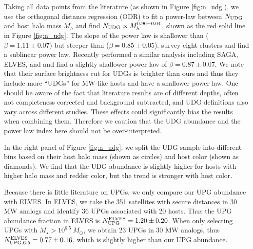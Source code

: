 \documentclass[twocolumn,astrosymb,twocolappendix]{aastex631}
\begin{document}
\begin{CJK*}{UTF8}{gbsn}
Taking all data points from the literature (as shown in Figure \ref{fig:n_udg}), we use the orthogonal distance regression (ODR) to fit a power-law between $N_{\rm UDG}$ and host halo mass $M_h$ and find $N_{\rm UDG} \propto M_h^{0.96\pm 0.04}$, shown as the red solid line in Figure \ref{fig:n_udg}. The slope of the power law is shallower than \citet{vdBurg2017} ($\beta=1.11\pm0.07$) but steeper than \citet{Roman2017b} ($\beta=0.85\pm0.05$). \citet{ManceraPina2018} survey eight clusters and find a sublinear power law. Recently \citet{Karunakaran2022b} performed a similar analysis including SAGA, ELVES, and \citet{Nashimoto2022} and find a slightly shallower power law of $\beta=0.87\pm0.07$. We note that their surface brightness cut for UDGs is brighter than ours and thus they include more ``UDGs'' for MW-like hosts and have a shallower power law. One should be aware of the fact that literature results are of different depths, often not completeness corrected and background subtracted, and UDG definitions also vary across different studies. These effects could significantly bias the results when combining them. Therefore we caution that the UDG abundance and the power law index here should not be over-interpreted. 


In the right panel of Figure \ref{fig:n_udg}, we split the UDG sample into different bins based on their host halo mass (shown as circles) and host color (shown as diamonds). We find that the UDG abundance is slightly higher for hosts with higher halo mass and redder color, but the trend is stronger with host color. 

Because there is little literature on UPGs, we only compare our UPG abundance with ELVES. In ELVES, we take the 351 satellites with secure distances in 30 MW analogs and identify 36 UPGs associated with 20 hosts. Thus the UPG abundance fraction in ELVES is $N_{\rm UPG}^{\rm ELVES} = 1.20 \pm 0.20$. When only selecting UPGs with $M_\star > 10^{6.5}\ M_\odot$, we obtain 23 UPGs in 30 MW analogs, thus $N_{\rm UPG, 6.5}^{\rm ELVES} = 0.77 \pm 0.16$, which is slightly higher than our UPG abundance.


\vspace{1em}


\end{CJK*}
\end{document}
